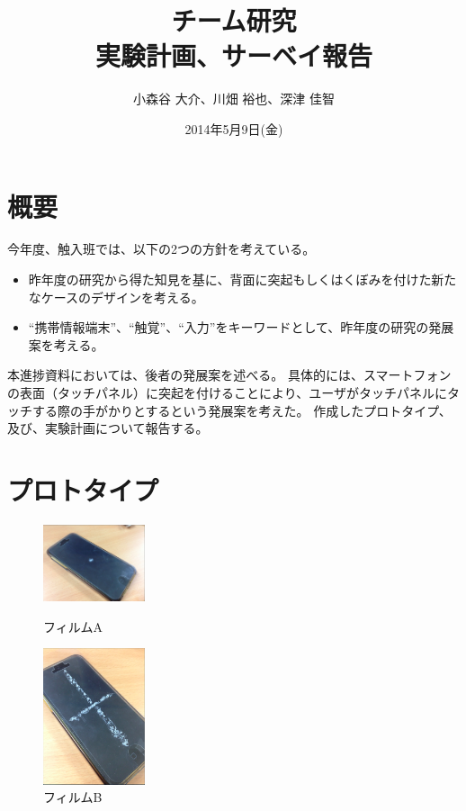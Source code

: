 \documentclass[11pt,a4paper]{jarticle}
\title{{チーム研究\\実験計画、サーベイ報告}}
\date{2014年5月9日(金)}
\author{小森谷 大介、川畑 裕也、深津 佳智}
\begin{document}
\maketitle

\section{概要}
今年度、触入班では、以下の2つの方針を考えている。
\begin{itemize}
	\item 昨年度の研究から得た知見を基に、背面に突起もしくはくぼみを付けた新たなケースのデザインを考える。
	\item ``携帯情報端末''、``触覚''、``入力''をキーワードとして、昨年度の研究の発展案を考える。
\end{itemize}
本進捗資料においては、後者の発展案を述べる。
具体的には、スマートフォンの表面（タッチパネル）に突起を付けることにより、ユーザがタッチパネルにタッチする際の手がかりとするという発展案を考えた。
作成したプロトタイプ、及び、実験計画について報告する。

\section{プロトタイプ}


\begin{figure}[H]
\begin{minipage}{0.5\hsize}
  \includegraphics[width=3cm]{figure4.eps}
  \caption{フィルムA}
\end{minipage}
\begin{minipage}{0.5\hsize}
  \includegraphics[width=3cm]{figure5.eps}
  \caption{フィルムB}
\end{minipage}
\end{figure}
\end{document}
